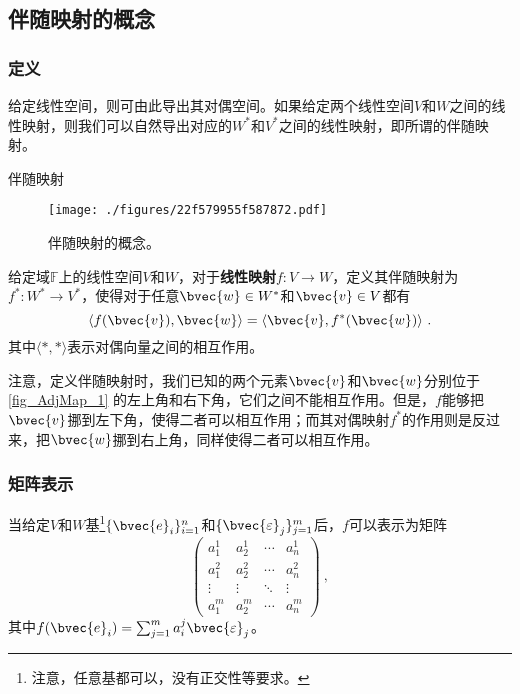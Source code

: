 


\subsection{伴随映射的概念}


\subsubsection{定义}

给定线性空间，则可由此导出其对偶空间。如果给定两个线性空间$V$和$W$之间的线性映射，则我们可以自然导出对应的$W^*$和$V^*$之间的线性映射，即所谓的伴随映射。



\begin{definition}{伴随映射}\label{def_AdjMap_1}

\begin{figure}[ht]
\centering
\texttt{[image: ./figures/22f579955f587872.pdf]}
\caption{伴随映射的概念。} \label{fig_AdjMap_1}
\end{figure}

给定域$\mathbb{F}$上的线性空间$V$和$W$，对于\textbf{线性映射}$f:V\to W$，定义其伴随映射为$f^*:W^*\to V^*$，使得对于任意$\bvec{w}\in W^*$和$\bvec{v}\in V$都有
\begin{equation}
\langle f(\bvec{v}), \bvec{w} \rangle = \langle \bvec{v}, f^*(\bvec{w}) \rangle~. 
\end{equation}
其中$\langle *, * \rangle$表示对偶向量之间的相互作用。
\end{definition}

注意，定义伴随映射时，我们已知的两个元素$\bvec{v}$和$\bvec{w}$分别位于\autoref{fig_AdjMap_1} 的左上角和右下角，它们之间不能相互作用。但是，$f$能够把$\bvec{v}$挪到左下角，使得二者可以相互作用；而其对偶映射$f^*$的作用则是反过来，把$\bvec{w}$挪到右上角，同样使得二者可以相互作用。



\subsubsection{矩阵表示}


当给定$V$和$W$基\footnote{注意，任意基都可以，没有正交性等要求。}$\{\bvec{e}_i\}_{i=1}^n$和$\{\bvec{\varepsilon}_j\}_{j=1}^m$后，$f$可以表示为矩阵
\begin{equation}
\begin{pmatrix}
a^1_1&a^1_2&\cdots&a^1_n\\
a^2_1&a^2_2&\cdots&a^2_n\\
\vdots&\vdots&\ddots&\vdots\\
a^m_1&a^m_2&\cdots&a^m_n
\end{pmatrix}~, 
\end{equation}
其中$f(\bvec{e}_i)=\sum_{j=1}^m a^j_i\bvec{\varepsilon}_j$。

